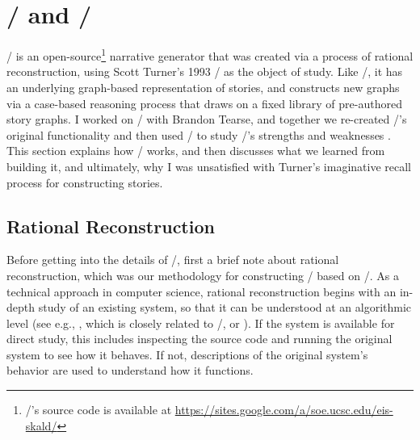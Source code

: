 \chapter{\minstrel/ and \skald/}

\label{ch:skald}

\skald/ is an open-source\footnote{\skald/'s source code is available at \url{https://sites.google.com/a/soe.ucsc.edu/eis-skald/}} narrative generator that was created via a process of rational reconstruction, using Scott Turner's 1993 \minstrel/ as the object of study.
%
Like \minstrel/, it has an underlying graph-based representation of stories, and constructs new graphs via a case-based reasoning process that draws on a fixed library of pre-authored story graphs.
%
I worked on \skald/ with Brandon Tearse, and together we re-created \minstrel/'s original functionality and then used \skald/ to study \minstrel/'s strengths and weaknesses \citep{Tearse2011, Tearse2012, Tearse2014}.
%
This section explains how \skald/ works, and then discusses what we learned from building it, and ultimately, why I was unsatisfied with Turner's imaginative recall process for constructing stories.



\section{Rational Reconstruction}


Before getting into the details of \skald/, first a brief note about rational reconstruction, which was our methodology for constructing \skald/ based on \minstrel/.
%
As a technical approach in computer science, rational reconstruction begins with an in-depth study of an existing system, so that it can be understood at an algorithmic level (see e.g., \citep{Peinado2006}, which is closely related to \skald/, or \citep{Musen1995}).
%
If the system is available for direct study, this includes inspecting the source code and running the original system to see how it behaves.
%
If not, descriptions of the original system's behavior are used to understand how it functions.


